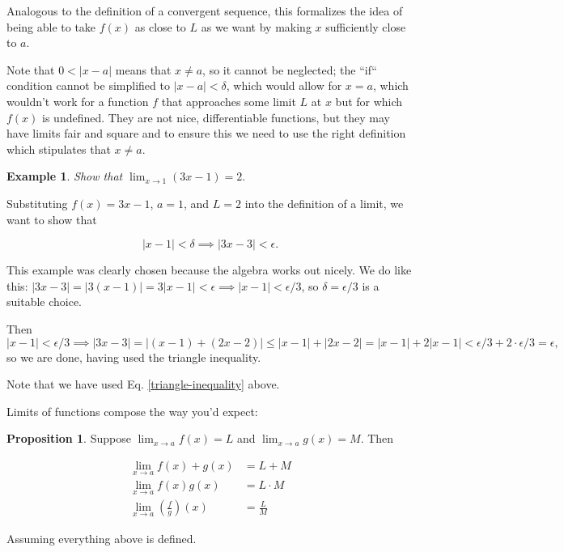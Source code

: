 \documentclass{article}
\theoremstyle{definition}
\newtheorem{example}{Example}[section]
\newtheorem{proposition}{Proposition}[section]
\begin{document}
Analogous to the definition of a convergent sequence, this formalizes the idea of being able to take $f(x)$ as close to $L$ as we want
by making $x$ sufficiently close to $a$.

Note that $0 < |x-a|$ means that $x \neq a$, so it cannot be neglected; the ``if`` condition cannot be simplified to $|x -a | < \delta$, which would allow for $x = a$, which wouldn't work for a function $f$ that approaches some limit $L$ at $x$ but for which $f(x)$ is undefined. They are not nice, differentiable functions, but they may have limits fair and square and to ensure this we need to use the right definition which stipulates that $x \neq a$.

\begin{example} 

\emph{Show that $\lim_{x \to 1} (3x-1) = 2$}.

Substituting $f(x) = 3x-1$, $a = 1$, and $L = 2$ into the definition of a limit,
we want to show that

\begin{equation}
|x - 1| < \delta \implies |3x - 3| < \epsilon.
\end{equation}

This example was clearly chosen because the algebra works out nicely. We do like this: $|3x-3| = |3(x-1)| = 3|x-1| < \epsilon \implies |x-1| <
\epsilon/3$, so $\delta = \epsilon/3$ is a suitable choice.

Then $|x - 1| < \epsilon/3 \implies |3x-3| = |(x - 1) + (2x-2)| \leq |x-1| +
|2x-2| = |x-1| + 2|x-1| < \epsilon/3 + 2 \cdot \epsilon/3 = \epsilon,$ so we are
done, having used the triangle inequality.

Note that we have used Eq. \ref{triangle-inequality} above.
 
\end{example}

Limits of functions compose the way you'd expect:
\begin{proposition}
Suppose $\lim_{x \to a} f(x) = L$ and $\lim_{x \to a} g(x) = M$. Then

\begin{align}
\lim_{x \to a} f(x) + g(x) & = L + M \\
\lim_{x \to a} f(x)g(x) & = L \cdot M \\
\lim_{x \to a} \left(\frac{f}{g}\right)(x) & = \frac{L}{M}
\end{align}

Assuming everything above is defined.

\end{proposition}
\end{document}
